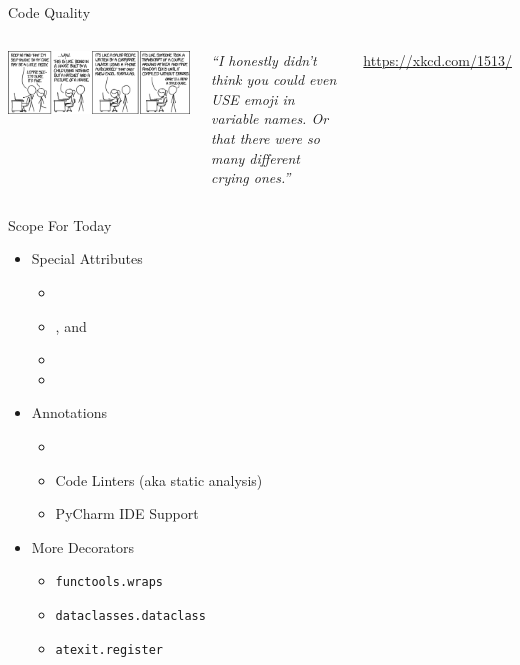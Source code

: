 
\begin{frame}[t,plain]
\titlepage
\end{frame}


\begin{frame}{Code Quality}
%
\begin{columns}
\begin{center}
\includegraphics[width=\linewidth]{./gfx/09-xkcd-code_quality}\\
\end{center}
%
\small
	\emph{\enquote{I honestly didn't think you could even USE emoji in variable names. Or that there were so many different crying ones.}}

	\vspace{6pt}
	\url{https://xkcd.com/1513/}
\end{columns}
%
\end{frame}


\begin{frame}{Scope For Today}
%
\begin{itemize}
\item Special Attributes
	\begin{itemize}
	\item {}
	\item {},  and 
	\item {}
	\item {}
	\end{itemize}
\item Annotations
	\begin{itemize}
	\item {}
	\item Code Linters (aka static analysis)
	\item PyCharm IDE Support
	\end{itemize}
\item More Decorators
	\begin{itemize}
	\item \texttt{functools.wraps}
	\item \texttt{dataclasses.dataclass}
	\item \texttt{atexit.register}
	\end{itemize}
\end{itemize}
%
\end{frame}

